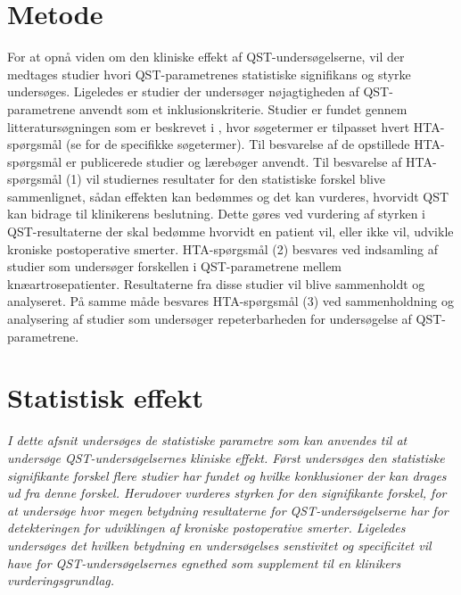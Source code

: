 \section{Metode}
For at opnå viden om den kliniske effekt af QST-undersøgelserne, vil der medtages studier hvori QST-parametrenes statistiske signifikans og styrke undersøges. Ligeledes er studier der undersøger nøjagtigheden af QST-parametrene anvendt som et inklusionskriterie. Studier er fundet gennem litteratursøgningen som er beskrevet i , hvor søgetermer er tilpasset hvert HTA-spørgsmål (se  for de specifikke søgetermer). Til besvarelse af de opstillede HTA-spørgsmål er publicerede studier og lærebøger anvendt. 
Til besvarelse af HTA-spørgsmål (1) vil studiernes resultater for den statistiske forskel blive sammenlignet, sådan effekten kan bedømmes og det kan vurderes, hvorvidt QST kan bidrage til klinikerens beslutning. Dette gøres ved vurdering af styrken i QST-resultaterne der skal bedømme hvorvidt en patient vil, eller ikke vil, udvikle kroniske postoperative smerter. HTA-spørgsmål (2) besvares ved indsamling af studier som undersøger forskellen i QST-parametrene mellem knæartrosepatienter. Resultaterne fra disse studier vil blive sammenholdt og analyseret. På samme måde besvares HTA-spørgsmål (3) ved sammenholdning og analysering af studier som undersøger repeterbarheden for undersøgelse af QST-parametrene.

\section{Statistisk effekt}
\textit{I dette afsnit undersøges de statistiske parametre som kan anvendes til at undersøge QST-undersøgelsernes kliniske effekt. Først undersøges den statistiske signifikante forskel flere studier har fundet og hvilke konklusioner der kan drages ud fra denne forskel. Herudover vurderes styrken for den signifikante forskel, for at undersøge hvor megen betydning resultaterne for QST-undersøgelserne har for detekteringen for udviklingen af kroniske postoperative smerter. Ligeledes undersøges det hvilken betydning en undersøgelses senstivitet og specificitet vil have for QST-undersøgelsernes egnethed som supplement til en klinikers vurderingsgrundlag.}

